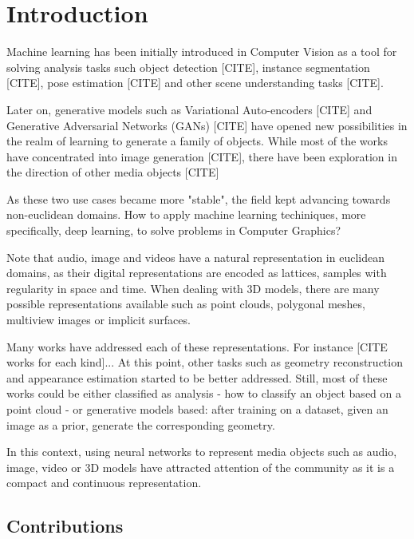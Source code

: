 \section{Introduction}




Machine learning has been initially introduced in Computer Vision as a tool for solving analysis tasks such object detection [CITE], instance segmentation [CITE], pose estimation [CITE] and other scene understanding tasks [CITE]. 

Later on, generative models such as Variational Auto-encoders [CITE] and Generative Adversarial Networks (GANs) [CITE] have opened new possibilities in the realm of learning to generate a family of objects. While most of the works have concentrated into image generation [CITE], there have been exploration in the direction of other media objects [CITE]


As these two use cases became more "stable", the field kept advancing towards non-euclidean domains. How to apply machine learning techiniques, more specifically, deep learning, to solve problems in Computer Graphics?

Note that audio, image and videos have a natural representation in euclidean domains, as their digital representations are encoded as lattices, samples with regularity in space and time. When dealing with 3D models, there are many possible representations available such as point clouds, polygonal meshes, multiview images or implicit surfaces.

Many works have addressed each of these representations. For instance [CITE works for each kind]... At this point, other tasks such as geometry reconstruction and appearance estimation started to be better addressed. Still, most of these works could be either classified as analysis - how to classify an object based on a point cloud - or generative models based: after training on a dataset, given an image as a prior, generate the corresponding geometry.

In this context, using neural networks to represent media objects such as audio, image, video or 3D models have attracted attention of the community as it is a compact and continuous representation. 



\subsection{Contributions}

